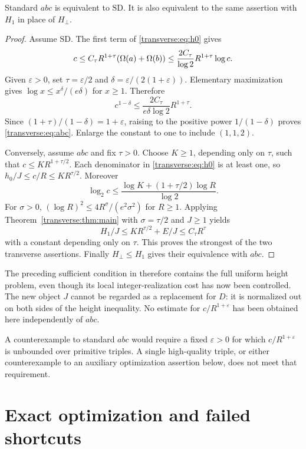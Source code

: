 \begin{theorem}\label{transverse:thm:equiv}
Standard $abc$ is equivalent to $\mathrm{SD}$. It is also equivalent to the same assertion with $H_1$ in place of $H_\perp$.
\end{theorem}
\begin{proof}
Assume $\mathrm{SD}$. The first term of \eqref{transverse:eq:h0} gives
\[
 c\le C_\tau R^{1+\tau}(\Omega(a)+\Omega(b))
 \le\frac{2C_\tau}{\log2}R^{1+\tau}\log c.
\]
Given $\varepsilon>0$, set $\tau=\varepsilon/2$ and $\delta=\varepsilon/(2(1+\varepsilon))$. Elementary maximization gives $\log x\le x^\delta/(e\delta)$ for $x\ge1$. Therefore
\[
 c^{1-\delta}\le\frac{2C_\tau}{e\delta\log2}R^{1+\tau}.
\]
Since $(1+\tau)/(1-\delta)=1+\varepsilon$, raising to the positive power $1/(1-\delta)$ proves \eqref{transverse:eq:abc}. Enlarge the constant to one to include $(1,1,2)$.

Conversely, assume $abc$ and fix $\tau>0$. Choose $K\ge1$, depending only on $\tau$, such that $c\le K R^{1+\tau/2}$. Each denominator in \eqref{transverse:eq:h0} is at least one, so $h_0/J\le c/R\le K R^{\tau/2}$. Moreover
\[
 \log_2c\le\frac{\log K+(1+\tau/2)\log R}{\log2}.
\]
For $\sigma>0$, $(\log R)^2\le4R^\sigma/(e^2\sigma^2)$ for $R\ge1$. Applying Theorem~\ref{transverse:thm:main} with $\sigma=\tau/2$ and $J\ge1$ yields
\[
 H_1/J\le K R^{\tau/2}+E/J\le C_\tau R^\tau
\]
with a constant depending only on $\tau$. This proves the strongest of the two transverse assertions. Finally $H_\perp\le H_1$ gives their equivalence with $abc$.
\end{proof}

The preceding sufficient condition in \cite{transverse:normalforms} therefore contains the full uniform height problem, even though its local integer-realization cost has now been controlled. The new object $J$ cannot be regarded as a replacement for $D$: it is normalized out on both sides of the height inequality. No estimate for $c/R^{1+\varepsilon}$ has been obtained here independently of $abc$.

A counterexample to standard $abc$ would require a fixed $\varepsilon>0$ for which $c/R^{1+\varepsilon}$ is unbounded over primitive triples. A single high-quality triple, or either counterexample to an auxiliary optimization assertion below, does not meet that requirement.

\section{Exact optimization and failed shortcuts}\label{transverse:sec:examples}
